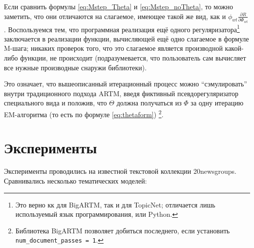 Если сравнить формулы \ref{eq:Mstep_Theta} и \ref{eq:Mstep_noTheta}, то можно заметить, что они отличаются на слагаемое, имеющее такой же вид, как и $\phi_{wt} \frac{\partial{R}}{\partial{\Phi_{wt}}}$. Воспользуемся тем, что программная реализация ещё одного регуляризатора\footnote{Это верно кк для BigARTM, так и для TopicNet; отличается лишь используемый язык программирования, \cpp или Python.}  заключается в реализации функции, вычисляющей ещё одно слагаемое в формуле M-шага; никаких проверок того, что это слагаемое является производной какой-либо функции, не происходит (подразумевается, что пользователь сам вычисляет все нужные производные снаружи библиотеки).  

Это означает, что вышеописанный итерационный процесс можно ``сэмулировать'' внутри традиционного подхода ARTM, введя фиктивный псевдорегуляризатор специального вида и положив, что $\Theta$ должна получаться из $\Phi$ за одну итерацию EM-алгоритма (то есть по формуле \ref{eq:thetaform}) \footnote{Библиотека BigARTM позволяет добиться последнего, если установить \texttt{num\_document\_passes\ =\ 1}.}.  


\section{Эксперименты} 

Эксперименты проводились на известной текстовой коллекции 20newsgroups. Сравнивались несколько тематических моделей:  

